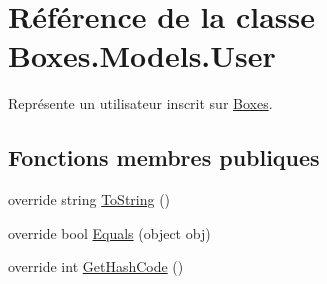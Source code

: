 \hypertarget{class_boxes_1_1_models_1_1_user}{}\section{Référence de la classe Boxes.\+Models.\+User}
\label{class_boxes_1_1_models_1_1_user}


Représente un utilisateur inscrit sur \hyperlink{namespace_boxes}{Boxes}.  


\subsection*{Fonctions membres publiques}
\begin{DoxyCompactItemize}
\item 
override string \hyperlink{class_boxes_1_1_models_1_1_user_ae106f3cdcb6add760af8b026b98f1e33}{To\+String} ()
\item 
override bool \hyperlink{class_boxes_1_1_models_1_1_user_ab96b001f2fc07c62ae34ae0c6153bbfe}{Equals} (object obj)
\item 
override int \hyperlink{class_boxes_1_1_models_1_1_user_afa32e28ab2b0193b3d7527407d62a7ba}{Get\+Hash\+Code} ()
\end{DoxyCompactItemize}
